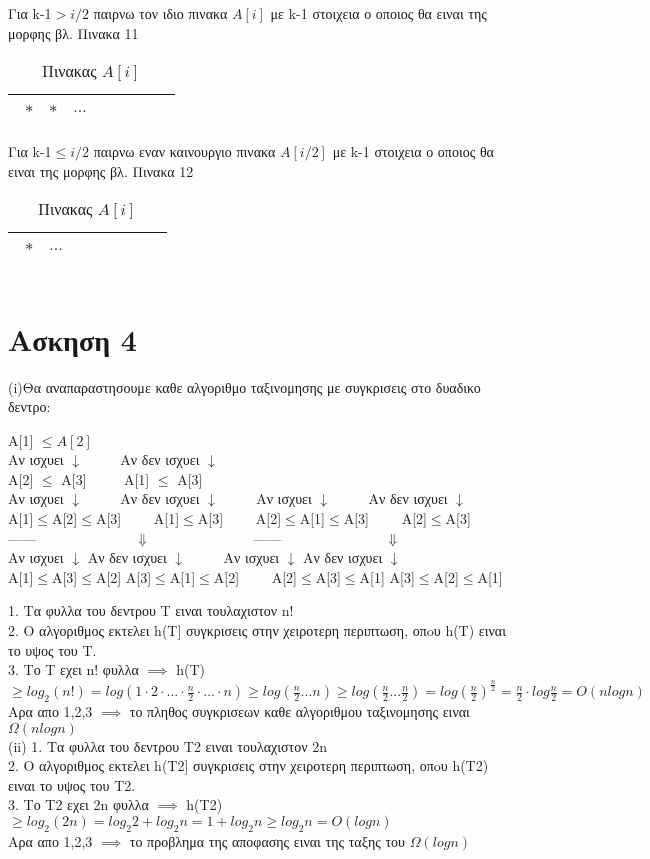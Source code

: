 \documentclass[12pt]{article}
\begin{document}
Για k-1$>i/2$ παιρνω τον ιδιο πινακα $A[i]$ με k-1 στοιχεια ο οποιος θα ειναι της μορφης βλ. Πινακα 11
$$ $$
\begin{table}[H]
\begin{center}
\caption{Πινακας $A[i]$}
\begin{tabular}{|l|c|r|c|l|l|c|r|}
\hline
\ $*$ & $*$ & $...$ & $  $ & $  $ & $  $\\
\hline
\end{tabular}
\end{center}
\end{table}
Για k-1$\leq i/2$ παιρνω εναν καινουργιο πινακα $A[i/2]$ με k-1 στοιχεια ο οποιος θα ειναι της μορφης βλ. Πινακα 12
$$ $$
\begin{table}[H]
\begin{center}
\caption{Πινακας $A[i]$}
\begin{tabular}{|l|c|r|c|l|l|c|r|}
\hline
\ $*$ & $...$ & $  $\\
\hline
\end{tabular}
\end{center}
\end{table}$$ $$



\section{Ασκηση 4}
(i)Θα αναπαραστησουμε καθε αλγοριθμο ταξινομησης με συγκρισεις στο δυαδικο δεντρο:$$ $$
$$ $$ 
\begin{center}
A[1] $\leq A[2] $ $$ $$
Αν ισχυει $\downarrow$ $\qquad$ Αν δεν ισχυει $\downarrow$ $$ $$
A[2] $\leq$ A[3] $\qquad$ A[1] $\leq$ A[3]$$ $$
Αν ισχυει $\downarrow$ $\qquad$ Αν δεν ισχυει $\downarrow$ $\qquad$ Αν ισχυει $\downarrow$ $\qquad$ Αν δεν ισχυει $\downarrow$ $$ $$
A[1]$\leq$A[2]$\leq$A[3]$\qquad$ A[1]$\leq$A[3]$\qquad$ A[2]$\leq$A[1]$\leq$A[3]$\qquad$ A[2]$\leq$A[3]$$ $$ 
------$\qquad$ $\qquad$ $\qquad$ $\Downarrow$ $\qquad$ $\qquad$ $\qquad$ ------ $\qquad$ $\qquad$ $\qquad$ $\Downarrow$ $$ $$
Αν ισχυει $\downarrow$  Αν δεν ισχυει $\downarrow$ $\qquad$ Αν ισχυει $\downarrow$ Αν δεν ισχυει $\downarrow$ $$ $$
A[1]$\leq$A[3]$\leq$A[2] A[3]$\leq$A[1]$\leq$A[2]$\qquad$ A[2]$\leq$A[3]$\leq$A[1] A[3]$\leq$A[2]$\leq$A[1]$$ $$ $$ $$ $$ $$
\end{center}
1. Τα φυλλα του δεντρου Τ ειναι τουλαχιστον n!$$ $$
2. Ο αλγοριθμος εκτελει h(Τ] συγκρισεις στην χειροτερη περιπτωση, οπoυ h(T) ειναι το υψος του Τ.$$ $$
3. Το Τ εχει n! φυλλα $\implies$ h(T)$\geq log_2 (n!)=log(1 \cdot 2 \cdot ... \cdot \frac{n}{2} \cdot ...\cdot n)\geq log(\frac{n}{2}...n)\geq log(\frac{n}{2}...\frac{n}{2})=log(\frac{n}{2})^\frac{n}{2}=\frac{n}{2} \cdot log\frac{n}{2}=O(nlogn)$ $$ $$
Aρα απο 1,2,3 $\implies$ το πληθος συγκρισεων καθε αλγοριθμου ταξινομησης ειναι $\Omega(nlogn)$ $$ $$ $$ $$
(ii)
1. Τα φυλλα του δεντρου Τ2 ειναι τουλαχιστον 2n$$ $$
2. Ο αλγοριθμος εκτελει h(Τ2] συγκρισεις στην χειροτερη περιπτωση, οπoυ h(T2) ειναι το υψος του Τ2.$$ $$
3. Το Τ2 εχει 2n φυλλα $\implies$ h(T2)$\geq log_2 (2n)=log_2 2 + log_2 n= 1 + log_2 n\geq log_2 n= O(logn)$ $$ $$
Aρα απο 1,2,3 $\implies$ το προβλημα της αποφασης ειναι της ταξης του $\Omega(logn)$ $$ $$ $$ $$
\end{document}

